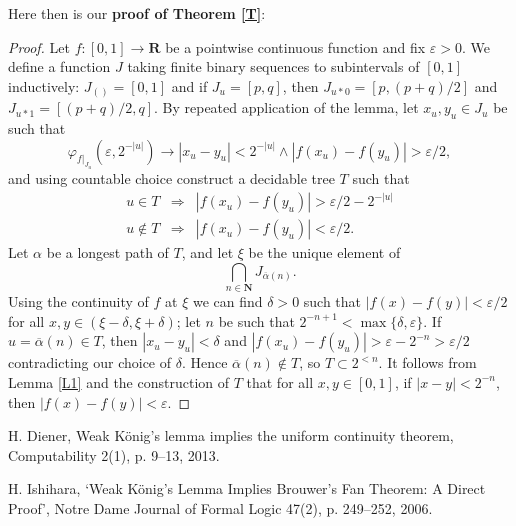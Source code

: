 \documentclass[11pt]{amsart}
\begin{document}
\bigskip
\noindent
Here then is our \textbf{proof of Theorem \ref{T}}:

\bigskip
\begin{proof}
Let $f:[0,1]\rightarrow\mathbf{R}$ be a pointwise continuous function and fix $\varepsilon>0$. We define a function $J$ taking finite binary sequences to subintervals of $[0,1]$ inductively: $J_{()}=[0,1]$ and if $J_u=[p,q]$, then $J_{u*0}=[p,(p+q)/2]$ and $J_{u*1}=[(p+q)/2,q]$. By repeated application of the lemma, let $x_u,y_u\in J_u$ be such that
  $$
   \varphi_{f|_{J_u}}(\varepsilon,2^{-|u|}) \rightarrow |x_u-y_u|<2^{-|u|} \wedge |f(x_u)-f(y_u)|>\varepsilon / 2,
  $$
\noindent
and using countable choice construct a decidable tree $T$ such that
 \begin{eqnarray*}
  u\in T & \Rightarrow & %
  |f(x_u)-f(y_u)|>\varepsilon / 2-2^{-|u|}\\
  u\notin T & \Rightarrow & %
  |f(x_u)-f(y_u)|<\varepsilon / 2.
 \end{eqnarray*}
\noindent
Let $\alpha$ be a longest path of $T$, and let $\xi$ be the unique element of
 $$
  \bigcap_{n\in\mathbf{N}}J_{\overline{\alpha}(n)}.
 $$  
\noindent
Using the continuity of $f$ at $\xi$ we can find $\delta>0$ such that $|f(x)-f(y)|<\varepsilon/2$ for all $x,y\in(\xi-\delta,\xi+\delta)$; let $n$ be such that $2^{-n+1}<\max\{\delta,\varepsilon\}$. If $u=\overline{\alpha}(n)\in T$, then $|x_u-y_u|<\delta$ and $|f(x_u)-f(y_u)|>\varepsilon-2^{-n}>\varepsilon/2$ contradicting our choice of $\delta$. Hence $\overline{\alpha}(n)\notin T$, so $T\subset 2^{<n}$. It follows from Lemma \ref{L1} and the construction of $T$ that for all $x,y\in[0,1]$, if $|x-y|<2^{-n}$, then $|f(x)-f(y)|<\varepsilon$.
\end{proof}

\begin{thebibliography}{99}

H. Diener, Weak K\"{o}nig's lemma implies the uniform continuity theorem, Computability 2(1), p. 9--13, 2013.

H. Ishihara,  `Weak K\"{o}nig's Lemma Implies Brouwer's Fan Theorem: A Direct Proof', Notre Dame Journal of Formal Logic 47(2), p. 249--252, 2006.

\end{thebibliography}
\end{document}
